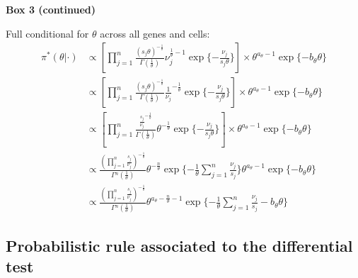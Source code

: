 \begin{Comment}
\textbf{Box 3 (continued)}

Full conditional for $\theta$ across all genes and cells:
\begin{align*}
\pi^*(\theta|\cdot)&\propto{}\left[\prod_{j=1}^{n}\frac{(s_j\theta)^{-\frac{1}{\theta}}}{\Gamma(\frac{1}{\theta})}\nu_j^{\frac{1}{\theta}-1}\exp\lbrace-\frac{\nu_j}{s_j\theta}\rbrace\right]\times{}\theta^{a_\theta-1}\exp\lbrace-b_\theta\theta\rbrace\\
&\propto{}\left[\prod_{j=1}^{n}\frac{(s_j\theta)^{-\frac{1}{\theta}}}{\Gamma(\frac{1}{\theta})}\frac{1}{\nu_j}^{-\frac{1}{\theta}}\exp\lbrace-\frac{\nu_j}{s_j\theta}\rbrace\right]\times\theta^{a_\theta-1}\exp\lbrace-b_\theta\theta\rbrace\\
&\propto{}\left[\prod_{j=1}^{n}\frac{\frac{s_j}{\nu_j}^{-\frac{1}{\theta}}}{\Gamma(\frac{1}{\theta})}\theta^{-\frac{1}{\theta}}\exp\lbrace-\frac{\nu_j}{s_j\theta}\rbrace\right]\times{}\theta^{a_\theta-1}\exp\lbrace-b_\theta\theta\rbrace\\
&\propto{}\frac{\left(\prod_{j=1}^{n}\frac{s_j}{\nu_j}\right)^{-\frac{1}{\theta}}}{\Gamma{}^n(\frac{1}{\theta})}\theta^{-\frac{n}{\theta}}\exp\lbrace-\frac{1}{\theta}\sum_{j=1}^n\frac{\nu_j}{s_j}\rbrace\theta^{a_\theta-1}\exp\lbrace-b_\theta\theta\rbrace\\
&\propto{}\frac{\left(\prod_{j=1}^{n}\frac{s_j}{\nu_j}\right)^{-\frac{1}{\theta}}}{\Gamma{}^n(\frac{1}{\theta})}\theta^{a_\theta-\frac{n}{\theta}-1}\exp\lbrace-\frac{1}{\theta}\sum_{j=1}^n\frac{\nu_j}{s_j}-b_\theta\theta\rbrace
\end{align*}
\end{Comment}


\subsection{Probabilistic rule associated to the differential test} \label{sec:differentialtest}

